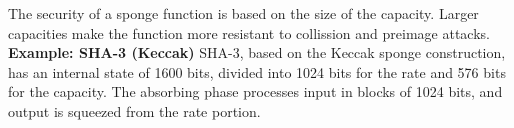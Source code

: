 The security of a sponge function is based on the size of the capacity. Larger capacities make the function more resistant to collission and preimage attacks. \\

\textbf{Example: SHA-3 (Keccak)}
SHA-3, based on the Keccak sponge construction, has an internal state of 1600 bits, divided into 1024 bits for the rate and 576 bits for the capacity. The absorbing phase processes input in blocks of 1024 bits, and output is squeezed from the rate portion.
